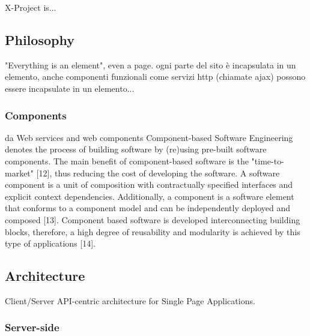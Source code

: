 \documentclass{sig-alternate}
\begin{document}
X-Project is...

\subsection{Philosophy}

"Everything is an element", even a page. 
ogni parte del sito è incapsulata in un elemento, anche componenti funzionali come servizi http (chiamate ajax) possono essere incapsulate in un elemento...

\subsubsection{Components}

da Web services and web components
Component-based Software Engineering denotes the process of building software by (re)using pre-built software components. The main benefit of component-based software is the "time-to-market" [12], thus reducing the cost of developing the software. A software component is a unit of composition with contractually specified interfaces and explicit context dependencies. Additionally, a component is a software element that conforms to a component model and can be independently deployed and composed [13]. Component based software is developed interconnecting building blocks, therefore, a high degree of reusability and modularity is achieved by this type of applications [14].

\subsection{Architecture}

Client/Server API-centric architecture for Single Page Applications.

\subsubsection{Server-side}
\end{document}
